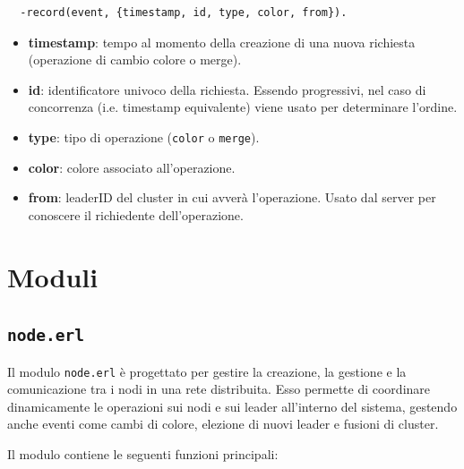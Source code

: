 \documentclass[12pt, a4paper]{report}
\begin{document}
\begin{tcolorbox}[title=Definizione del record \texttt{event}]
\begin{verbatim}
  -record(event, {timestamp, id, type, color, from}).
\end{verbatim}
\end{tcolorbox}

\begin{itemize}
    \item \textbf{timestamp}: tempo al momento della creazione di una nuova richiesta (operazione di cambio colore o merge).
    \item \textbf{id}: identificatore univoco della richiesta. Essendo progressivi, nel caso di concorrenza (i.e. timestamp equivalente) viene usato per determinare l'ordine.
    \item \textbf{type}: tipo di operazione (\texttt{color} o \texttt{merge}).
    \item \textbf{color}: colore associato all'operazione.
    \item \textbf{from}: leaderID del cluster in cui avver\`a l'operazione. Usato dal server per conoscere il richiedente dell'operazione.
\end{itemize}

\section{Moduli}

\subsection{\texttt{node.erl}}

Il modulo \texttt{node.erl} \`e progettato per gestire la creazione, la gestione e la comunicazione tra i nodi in una rete distribuita. Esso permette di coordinare dinamicamente le operazioni sui nodi e sui leader all'interno del sistema, gestendo anche eventi come cambi di colore, elezione di nuovi leader e fusioni di cluster.

Il modulo contiene le seguenti funzioni principali:
\end{document}

